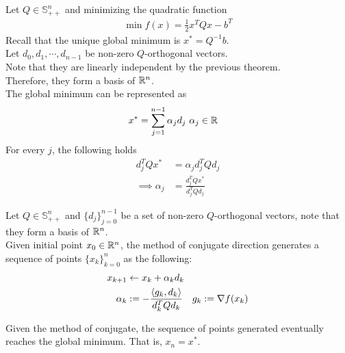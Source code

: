 \documentclass{article}
\begin{document}
	\begin{example}
		Let $Q \in \mathbb{S}_{++}^n$ and minimizing the quadratic function
		\begin{align}
			\min f(x) = \frac{1}{2} x^T Q x - b^T 
		\end{align}
		Recall that the unique global minimum is $x^* = Q^{-1} b$. \\
		Let $d_0, d_1, \cdots, d_{n-1}$ be non-zero $Q$-orthogonal vectors. \\
		Note that they are linearly independent by the previous theorem. \\
		Therefore, they form a basis of $\mathbb{R}^n$. \\
		The global minimum can be represented as 
		\begin{align}
			x^* &= \sum_{j=1}^{n-1} \alpha_j d_j\ \alpha_j \in \mathbb{R}
		\end{align}
		For every $j$, the following holds
		\begin{align}
			d_j^T Q x^* &= \alpha_j d_j^T Q d_j \\
			\implies \alpha_j &= \frac{d_j^T Q x^*}{d_j^T Q d_j}
		\end{align}
	\end{example}
	
	\begin{algorithm}
		Let $Q \in \mathbb{S}_{++}^n$ and $\{d_j\}_{j=0}^{n-1}$ be a set of non-zero $Q$-orthogonal vectors, note that they form a basis of $\mathbb{R}^n$. \\
		Given initial point $x_0 \in \mathbb{R}^n$, the method of conjugate direction generates a sequence of points $\{x_k\}_{k=0}^n$ as the following:
		\begin{align}
			x_{k+1} &\leftarrow x_k + \alpha_k d_k \\
			\alpha_k &:= - \frac{\langle {g_k}, {d_k} \rangle}{d_k^T Q d_k} \quad g_k := \nabla f(x_k)
		\end{align}
	\end{algorithm}
	
	\begin{theorem}
		Given the method of conjugate, the sequence of points generated eventually reaches the global minimum. That is, $x_n = x^*$.
	\end{theorem}
	
\end{document}
